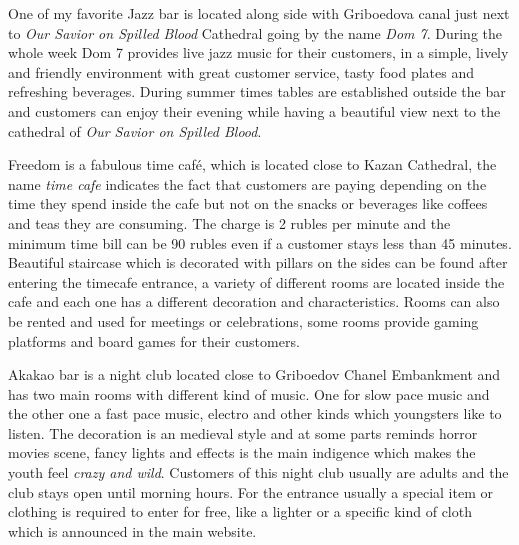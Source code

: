 \documentclass[10pt,a4paper]{article} %
\begin{document}
\begin{multicols}{3}
One of my favorite Jazz bar is located along side with Griboedova canal just next 
to \textit{Our Savior on Spilled Blood} Cathedral going by the name \textit{Dom 7}. 
During the whole week Dom 7 provides live jazz music for their customers, 
in a simple, lively and friendly environment with great customer service, 
tasty food plates and refreshing beverages. 
During summer times tables are established outside the bar and customers 
can enjoy their evening while having a beautiful view next to the cathedral 
of \textit{Our Savior on Spilled Blood}.

Freedom is a fabulous time café, which is located close to Kazan Cathedral, 
the name \textit{time cafe} indicates the fact that customers are paying depending 
on the time they spend inside the cafe but not on the snacks or beverages 
like coffees and teas they are consuming. 
The charge is 2 rubles per minute and the minimum time bill can be 90 rubles even 
if a customer stays less than 45 minutes. 
Beautiful staircase which is decorated with pillars on the sides 
can be found after entering the timecafe entrance, a variety of different rooms 
are located inside the cafe and each one has a different decoration and characteristics. 
Rooms can also be rented and used for meetings or celebrations, 
some rooms provide gaming platforms and board games for their customers.

Akakao bar is a night club located close to Griboedov Chanel Embankment 
and has two main rooms with different kind of music. 
One for slow pace music and the other one a fast pace music, 
electro and other kinds which youngsters like to listen. 
The decoration is an medieval style and at some parts reminds horror movies scene, 
fancy lights and effects is the main indigence which makes the youth feel 
\textit{crazy and wild}. 
Customers of this night club usually are adults and the club stays open until morning hours. 
For the entrance usually a special item or clothing is required to enter for free, 
like a lighter or a specific kind of cloth which is announced in the main website.


\end{multicols}
\end{document}
